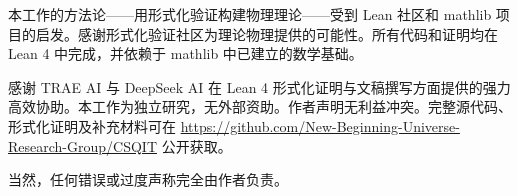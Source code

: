 \documentclass[aps,prd,twocolumn,nofootinbib,floatfix]{revtex4-2}
\begin{document}
\acknowledgments

本工作的方法论——用形式化验证构建物理理论——受到 Lean 社区和 mathlib 项目的启发。感谢形式化验证社区为理论物理提供的可能性。所有代码和证明均在 Lean 4 中完成，并依赖于 mathlib 中已建立的数学基础。

感谢 TRAE AI 与 DeepSeek AI 在 Lean 4 形式化证明与文稿撰写方面提供的强力高效协助。本工作为独立研究，无外部资助。作者声明无利益冲突。完整源代码、形式化证明及补充材料可在 \url{https://github.com/New-Beginning-Universe-Research-Group/CSQIT} 公开获取。

当然，任何错误或过度声称完全由作者负责。


\end{document}

